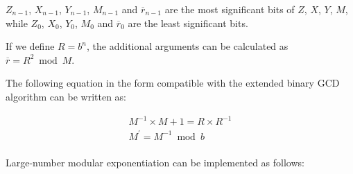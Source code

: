 \documentclass[main\_\_EN.tex]{subfiles}
\begin{document}
\begin{math}Z_{n-1}\end{math},
\begin{math}X_{n-1}\end{math},
\begin{math}Y_{n-1}\end{math},
\begin{math}M_{n-1}\end{math} and
\begin{math}\overline{r}_{n-1}\end{math} are the most significant bits of
\begin{math}Z\end{math},
\begin{math}X\end{math},
\begin{math}Y\end{math},
\begin{math}M\end{math}, while
\begin{math}Z_{0}\end{math},
\begin{math}X_{0}\end{math},
\begin{math}Y_{0}\end{math},
\begin{math}M_{0}\end{math} and
\begin{math}\overline{r}_{0}\end{math} are the least significant bits.

If we define \begin{math}R = b^{n}\end{math}, the additional arguments can be calculated as \begin{math}\overline{r} = R^{2} \bmod M\end{math}. 

The following equation in the form compatible with the extended binary GCD algorithm can be written as: 

\begin{gather*}
        M^{-1} \times M + 1 = R \times R^{-1} \\
        M^{\prime} = M^{-1} \bmod b\\
\end{gather*}

Large-number modular exponentiation can be implemented as follows:
\end{document}
